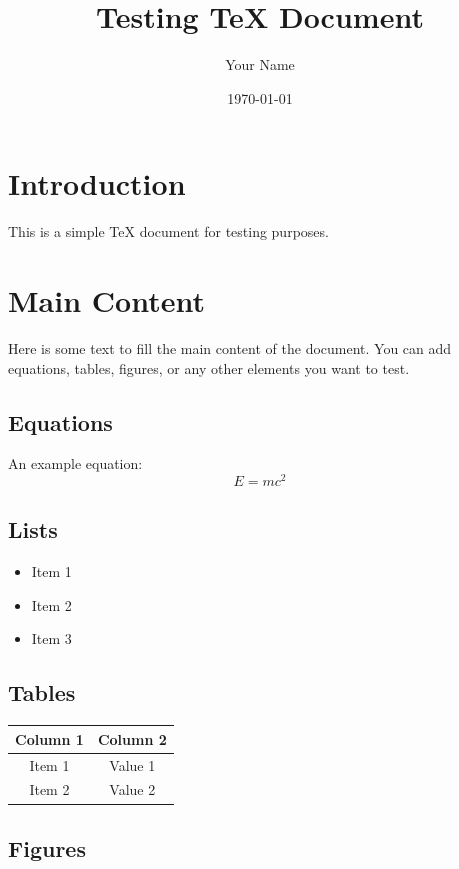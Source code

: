 \documentclass{article}
\title{Testing TeX Document}
\author{Your Name}
\date{\today}
\begin{document}
    \maketitle

    \section{Introduction}

    This is a simple TeX document for testing purposes.

    \section{Main Content}

    Here is some text to fill the main content of the document. You can add equations, tables, figures, or any other elements you want to test.

    \subsection{Equations}

    An example equation:
    \[
        E = mc^2
    \]

    \subsection{Lists}

    \begin{itemize}
        \item Item 1
        \item Item 2
        \item Item 3
    \end{itemize}

    \subsection{Tables}

    \begin{tabular}{|c|c|}
        \hline
        Column 1 & Column 2 \\
        \hline
        Item 1 & Value 1 \\
        Item 2 & Value 2 \\
        \hline
    \end{tabular}

    \subsection{Figures}
\end{document}
